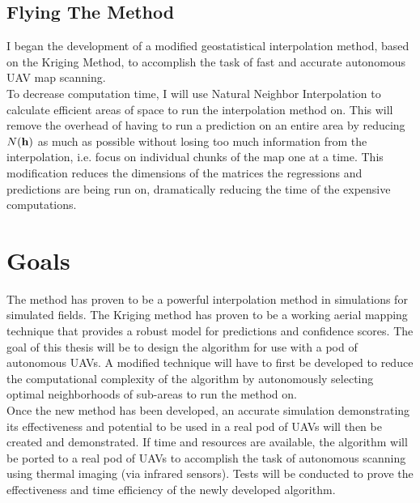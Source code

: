 \documentclass[preprint,12pt]{elsarticle}
\begin{document}
\subsection{Flying The Method}
\noindent
I began the development of a modified geostatistical interpolation method, based on the Kriging Method, to accomplish the task of fast and accurate autonomous UAV map scanning.\\
To decrease computation time, I will use Natural Neighbor Interpolation to calculate efficient areas of space to run the interpolation method on. This will remove the overhead of having to run a prediction on an entire area by reducing $N({\bf{h}})$ as much as possible without losing too much information from the interpolation, i.e. focus on individual chunks of the map one at a time. This modification reduces the dimensions of the matrices the regressions and predictions are being run on, dramatically reducing the time of the expensive computations.\\
\section{Goals}
\label{S:2}
\noindent
The method has proven to be a powerful interpolation method in simulations for simulated fields. The Kriging method has proven to be a working aerial mapping technique that provides a robust model for predictions and confidence scores. The goal of this thesis will be to design the algorithm for use with a pod of autonomous UAVs. A modified technique will have to first be developed to reduce the computational complexity of the algorithm by autonomously selecting optimal neighborhoods of sub-areas to run the method on.\\
Once the new method has been developed, an accurate simulation demonstrating its effectiveness and potential to be used in a real pod of UAVs will then be created and demonstrated. 
If time and resources are available, the algorithm will be ported to a real pod of UAVs to accomplish the task of autonomous scanning using thermal imaging (via infrared sensors). Tests will be conducted to prove the effectiveness and time efficiency of the newly developed algorithm.

\end{document}
